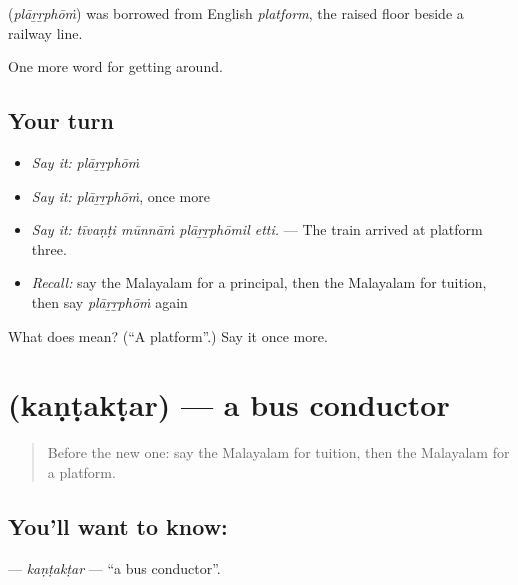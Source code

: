 \begin{cousinweb}
\textbf{} (\emph{plāṟṟphōṁ}) was borrowed from English \emph{platform}, the raised floor beside a railway line.
\end{cousinweb}

\begin{grammarlens}[title={What you've built}]
One more word for getting around.
\end{grammarlens}

\subsection*{Your turn}
\begin{itemize}
\raggedright
  \item \emph{Say it:} \emph{plāṟṟphōṁ}
  \item \emph{Say it:} \emph{plāṟṟphōṁ}, once more
  \item \emph{Say it:} \emph{tīvaṇṭi mūnnāṁ plāṟṟphōmil etti.} — The train arrived at platform three.
  \item \emph{Recall:} say the Malayalam for a principal, then the Malayalam for tuition, then say \emph{plāṟṟphōṁ} again
\end{itemize}

\begin{tcolorbox}[breakable,colback=teal!4,colframe=teal!35!black,title={Before you move on}]
What does  mean? (\textquotedblleft{}A platform\textquotedblright{}.) Say it once more.
\end{tcolorbox}
\section[\texorpdfstring{\ml{കണ്ടക്ടർ} (kaṇṭakṭar)}{കണ്ടക്ടർ (kaṇṭakṭar)}]{ (kaṇṭakṭar) — a bus conductor}

\label{lesson:ML-C461-kantaktar}



\begin{quote}
Before the new one: say the Malayalam for tuition, then the Malayalam for a platform.
\end{quote}

\subsection*{You'll want to know: }
\textbf{} — \emph{kaṇṭakṭar} — \textquotedblleft{}a bus conductor\textquotedblright{}.


